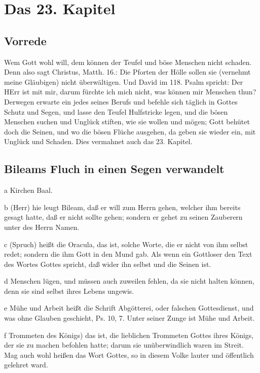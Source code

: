 \chapter{Das 23. Kapitel}

\section{Vorrede}

Wem Gott wohl will, dem können der Teufel und böse Menschen nicht schaden. Denn also sagt Christus, Matth. 16.: Die Pforten der Hölle sollen sie (vernehmt meine Gläubigen) nicht überwältigen. Und David im 118. Psalm spricht: Der HErr ist mit mir, darum fürchte ich mich nicht, was können mir Menschen thun? Derwegen erwarte ein jedes seines Berufs und befehle sich täglich in Gottes Schutz und Segen, und lasse den Teufel Hulfstricke legen, und die bösen Menschen suchen und Unglück stiften, wie sie wollen und mögen; Gott behütet doch die Seinen, und wo die bösen Flüche ausgehen, da geben sie wieder ein, mit Unglück und Schaden. Dies vermahnet auch das 23. Kapitel.

\section{Bileams Fluch in einen Segen verwandelt}

a Kirchen Baal.

b (Herr) hie leugt Bileam, daß er will zum Herrn gehen, welcher ihm bereits gesagt hatte, daß er nicht sollte gehen; sondern er gehet zu seinen Zauberern unter des Herrn Namen.

c (Spruch) heißt die Oracula, das ist, solche Worte, die er nicht von ihm selbst redet; sondern die ihm Gott in den Mund gab. Als wenn ein Gottloser den Text des Wortes Gottes spricht, daß wider ihn selbst und die Seinen ist.

d Menschen lügen, und müssen auch zuweilen fehlen, da sie nicht halten können, denn sie sind selbst ihres Lebens ungewis.

e Mühe und Arbeit heißt die Schrift Abgötterei, oder falschen Gottesdienst, und was ohne Glauben geschieht, Ps. 10, 7. Unter seiner Zunge ist Mühe und Arbeit.

f Trommeten des Königs) das ist, die lieblichen Trommeten Gottes ihres Königs, der sie zu machen befohlen hatte; darum sie unüberwindlich waren im Streit. Mag auch wohl heißen das Wort Gottes, so in diesem Volke lauter und öffentlich gelehret ward.

